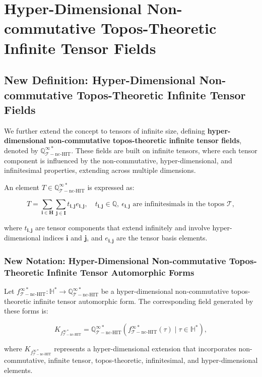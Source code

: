\documentclass{article}
\begin{document}
\section{Hyper-Dimensional Non-commutative Topos-Theoretic Infinite Tensor Fields}
\subsection{New Definition: Hyper-Dimensional Non-commutative Topos-Theoretic Infinite Tensor Fields}
We further extend the concept to tensors of infinite size, defining \textbf{hyper-dimensional non-commutative topos-theoretic infinite tensor fields}, denoted by \(\mathbb{Q}_{\mathcal{T}-\text{nc-HIT}}^{\infty *}\). These fields are built on infinite tensors, where each tensor component is influenced by the non-commutative, hyper-dimensional, and infinitesimal properties, extending across multiple dimensions.

An element \(T \in \mathbb{Q}_{\mathcal{T}-\text{nc-HIT}}^{\infty *}\) is expressed as:

\[
T = \sum_{\mathbf{i} \in \mathbf{H}} \sum_{\mathbf{j} \in \mathbf{I}} t_{\mathbf{i}, \mathbf{j}} e_{\mathbf{i}, \mathbf{j}}, \quad t_{\mathbf{i}, \mathbf{j}} \in \mathbb{Q}, \ \epsilon_{\mathbf{i}, \mathbf{j}} \text{ are infinitesimals in the topos } \mathcal{T},
\]

where \(t_{\mathbf{i}, \mathbf{j}}\) are tensor components that extend infinitely and involve hyper-dimensional indices \(\mathbf{i}\) and \(\mathbf{j}\), and \(e_{\mathbf{i}, \mathbf{j}}\) are the tensor basis elements.

\subsubsection{New Notation: Hyper-Dimensional Non-commutative Topos-Theoretic Infinite Tensor Automorphic Forms}
Let \(f_{\mathcal{T}-\text{nc-HIT}}^{\infty *}: \mathbb{H}^* \to \mathbb{Q}_{\mathcal{T}-\text{nc-HIT}}^{\infty *}\) be a hyper-dimensional non-commutative topos-theoretic infinite tensor automorphic form. The corresponding field generated by these forms is:

\[
K_{f_{\mathcal{T}-\text{nc-HIT}}^{\infty *}} = \mathbb{Q}_{\mathcal{T}-\text{nc-HIT}}^{\infty *}(f_{\mathcal{T}-\text{nc-HIT}}^{\infty *}(\tau) \mid \tau \in \mathbb{H}^*),
\]

where \(K_{f_{\mathcal{T}-\text{nc-HIT}}^{\infty *}}\) represents a hyper-dimensional extension that incorporates non-commutative, infinite tensor, topos-theoretic, infinitesimal, and hyper-dimensional elements.
\end{document}
